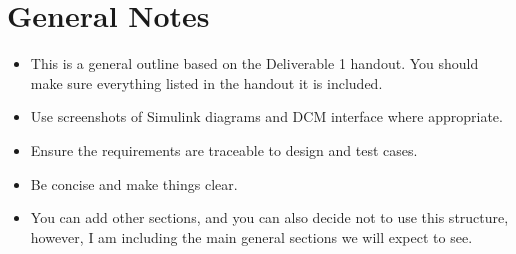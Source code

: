 \documentclass{article}
\begin{document}
\section{General Notes}
\begin{itemize}
    \item This is a general outline based on the Deliverable 1 handout. You should make sure everything listed in the handout it is included. 
    \item Use screenshots of Simulink diagrams and DCM interface where appropriate.
    \item Ensure the requirements are traceable to design and test cases.
    \item Be concise and make things clear.
    \item You can add other sections, and you can also decide not to use this structure, however, I am including the main general sections we will expect to see.
\end{itemize}
\end{document}
